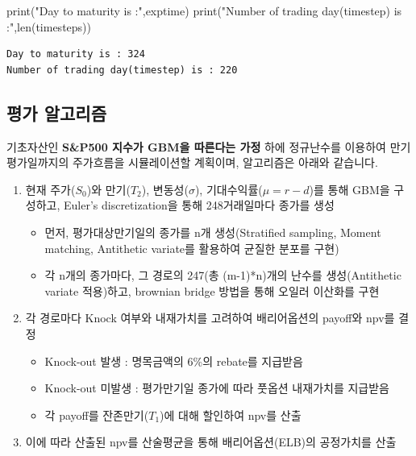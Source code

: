 \documentclass[
  a4paper,
  DIV=11,
  numbers=noendperiod]{scrreprt}
\newenvironment{Shaded}{\begin{snugshade}}{\end{snugshade}}
\newcommand{\BuiltInTok}[1]{\textcolor[rgb]{0.00,0.23,0.31}{#1}}
\newcommand{\NormalTok}[1]{\textcolor[rgb]{0.00,0.23,0.31}{#1}}
\newcommand{\StringTok}[1]{\textcolor[rgb]{0.13,0.47,0.30}{#1}}
\providecommand{\tightlist}{%
  \setlength{\itemsep}{0pt}\setlength{\parskip}{0pt}}\usepackage{longtable,booktabs,array}
\begin{document}
\begin{tcolorbox}
\begin{Shaded}
\begin{Highlighting}[]
\BuiltInTok{print}\NormalTok{(}\StringTok{"Day to maturity is :"}\NormalTok{,exptime)}
\BuiltInTok{print}\NormalTok{(}\StringTok{"Number of trading day(timestep) is :"}\NormalTok{,}\BuiltInTok{len}\NormalTok{(timesteps))}
\end{Highlighting}
\end{Shaded}

\begin{verbatim}
Day to maturity is : 324
Number of trading day(timestep) is : 220
\end{verbatim}

\end{tcolorbox}

\subsection*{평가 알고리즘}\label{uxd3c9uxac00-uxc54cuxace0uxb9acuxc998}

기초자산인 \textbf{S\&P500 지수가 GBM을 따른다는 가정} 하에 정규난수를
이용하여 만기평가일까지의 주가흐름을 시뮬레이션할 계획이며, 알고리즘은
아래와 같습니다.

\begin{enumerate}
\def\labelenumi{(\arabic{enumi})}
\tightlist
\item
  현재 주가(\(S_0\))와 만기(\(T_2\)), 변동성(\(\sigma\)),
  기대수익률(\(\mu=r-d\))를 통해 GBM을 구성하고, Euler's
  discretization을 통해 248거래일마다 종가를 생성

  \begin{itemize}
  \tightlist
  \item
    먼저, 평가대상만기일의 종가를 n개 생성(Stratified sampling, Moment
    matching, Antithetic variate를 활용하여 균질한 분포를 구현)
  \item
    각 n개의 종가마다, 그 경로의 247(총 (m-1)*n)개의 난수를
    생성(Antithetic variate 적용)하고, brownian bridge 방법을 통해
    오일러 이산화를 구현
  \end{itemize}
\item
  각 경로마다 Knock 여부와 내재가치를 고려하여 배리어옵션의 payoff와
  npv를 결정

  \begin{itemize}
  \tightlist
  \item
    Knock-out 발생 : 명목금액의 6\%의 rebate를 지급받음
  \item
    Knock-out 미발생 : 평가만기일 종가에 따라 풋옵션 내재가치를 지급받음
  \item
    각 payoff를 잔존만기(\(T_1\))에 대해 할인하여 npv를 산출
  \end{itemize}
\item
  이에 따라 산출된 npv를 산술평균을 통해 배리어옵션(ELB)의 공정가치를
  산출
\end{enumerate}
\end{document}
